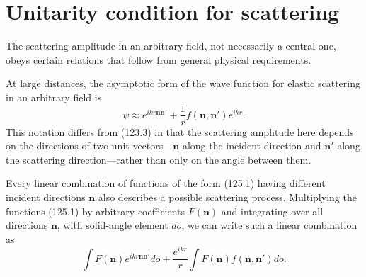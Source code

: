\section{Unitarity condition for scattering}

The scattering amplitude in an arbitrary field, not necessarily a central one, obeys certain relations that follow from general physical requirements.

At large distances, the asymptotic form of the wave function for elastic scattering in an arbitrary field is
\begin{equation}
 \psi\approx e^{ikr\mathbf n\mathbf n'}+\frac1r
 f(\mathbf n,\mathbf n')e^{ikr}.
 \tag{125.1}
\end{equation}
This notation differs from (123.3) in that the scattering amplitude here depends on the directions of two unit vectors---$\mathbf n$ along the incident direction and $\mathbf n'$ along the scattering direction---rather than only on the angle between them.

Every linear combination of functions of the form (125.1) having different incident directions $\mathbf n$ also describes a possible scattering process. Multiplying the functions (125.1) by arbitrary coefficients $F(\mathbf n)$ and integrating over all directions $\mathbf n$, with solid-angle element $do$, we can write such a linear combination as
\begin{equation}
 \int F(\mathbf n)e^{ikr\mathbf n\mathbf n'}do
 +\frac{e^{ikr}}r\int F(\mathbf n)f(\mathbf n,\mathbf n')do.
 \tag{125.2}
\end{equation}

